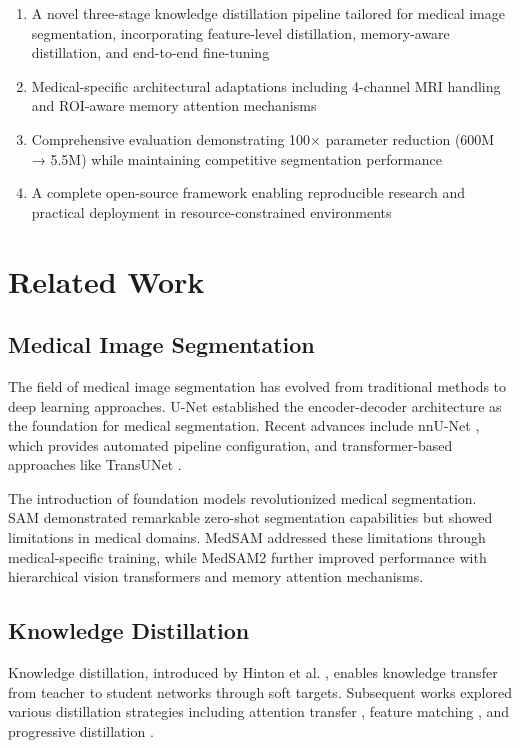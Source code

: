 \documentclass[conference]{IEEEtran}
\begin{document}
\begin{enumerate}
    \item A novel three-stage knowledge distillation pipeline tailored for medical image segmentation, incorporating feature-level distillation, memory-aware distillation, and end-to-end fine-tuning
    \item Medical-specific architectural adaptations including 4-channel MRI handling and ROI-aware memory attention mechanisms
    \item Comprehensive evaluation demonstrating 100× parameter reduction (600M → 5.5M) while maintaining competitive segmentation performance
    \item A complete open-source framework enabling reproducible research and practical deployment in resource-constrained environments
\end{enumerate}

\section{Related Work}

\subsection{Medical Image Segmentation}

The field of medical image segmentation has evolved from traditional methods to deep learning approaches. U-Net \cite{ronneberger2015u} established the encoder-decoder architecture as the foundation for medical segmentation. Recent advances include nnU-Net \cite{isensee2021nnu}, which provides automated pipeline configuration, and transformer-based approaches like TransUNet \cite{chen2021transunet}.

The introduction of foundation models revolutionized medical segmentation. SAM \cite{kirillov2023segment} demonstrated remarkable zero-shot segmentation capabilities but showed limitations in medical domains. MedSAM \cite{ma2024medsam} addressed these limitations through medical-specific training, while MedSAM2 \cite{cheng2024medsam2} further improved performance with hierarchical vision transformers and memory attention mechanisms.

\subsection{Knowledge Distillation}

Knowledge distillation, introduced by Hinton et al. \cite{hinton2015distilling}, enables knowledge transfer from teacher to student networks through soft targets. Subsequent works explored various distillation strategies including attention transfer \cite{zagoruyko2016paying}, feature matching \cite{romero2014fitnets}, and progressive distillation \cite{phuong2019towards}.
\end{document}

